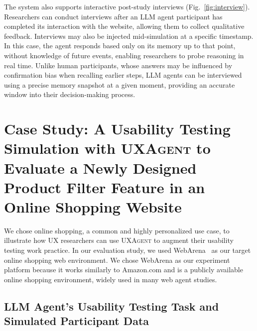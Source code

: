 \documentclass[manuscript,review,anonymous]{acmart}
\DeclareRobustCommand{\projectname}{\textsc{UXAgent}\xspace}
\begin{document}
The system also supports interactive post-study interviews (Fig.~\ref{fig:interview}).
Researchers can conduct interviews after an LLM agent participant has completed its interaction with the website, allowing them to collect qualitative feedback.
Interviews may also be injected mid-simulation at a specific timestamp.
In this case, the agent responds based only on its memory up to that point, without knowledge of future events, enabling researchers to probe reasoning in real time.
Unlike human participants, whose answers may be influenced by confirmation bias \cite{klayman1995varieties} when recalling earlier steps, LLM agents can be interviewed using a precise memory snapshot at a given moment, providing an accurate window into their decision-making process.  



\section{Case Study: A Usability Testing Simulation with \projectname to Evaluate a Newly Designed Product Filter Feature in an Online Shopping Website }

We chose online shopping, a common and highly personalized use case, to illustrate how UX researchers can use \projectname to augment their usability testing work practice.
In our evaluation study, we used WebArena~\cite{zhouWebArenaRealisticWeb2024} as our target online shopping web environment.
We chose WebArena as our experiment platform because it works similarly to Amazon.com and is a publicly available online shopping environment, widely used in many web agent studies\cite{suLearnbyinteractDataCentricFramework2024, yangAgentOccamSimpleStrong2024}.


\subsection{LLM Agent's Usability Testing Task and Simulated Participant Data}
\end{document}
